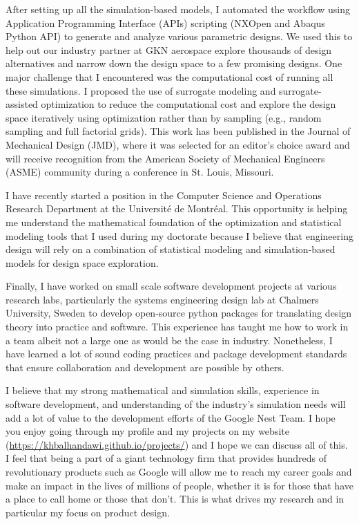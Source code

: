 \documentclass[12pt]{article} %
\begin{document}
\medskip %

After setting up all the simulation-based models, I automated the workflow using Application Programming Interface (APIs) scripting (NXOpen and Abaqus Python API)  to generate and analyze various parametric designs. We used this to help out our industry partner at GKN aerospace explore thousands of design alternatives and narrow down the design space to a few promising designs. One major challenge that I encountered was the computational cost of running all these simulations. I proposed the use of surrogate modeling and surrogate-assisted optimization to reduce the computational cost and explore the design space iteratively using optimization rather than by sampling (e.g., random sampling and full factorial grids). This work has been published in the Journal of Mechanical Design (JMD), where it was selected for an editor's choice award and will receive recognition from the American Society of Mechanical Engineers (ASME) community during a conference in St. Louis, Missouri.

\medskip %

I have recently started a position in the Computer Science and Operations Research Department at the Universit\'{e} de Montr\'{e}al. This opportunity is helping me understand the mathematical foundation of the optimization and statistical modeling tools that I used during my doctorate because I believe that engineering design will rely on a combination of statistical modeling and simulation-based models for design space exploration.

\medskip %

Finally, I have worked on small scale software development projects at various research labs, particularly the systems engineering design lab at Chalmers University, Sweden to develop open-source python packages for translating design theory into practice and software. This experience has taught me how to work in a team albeit not a large one as would be the case in industry. Nonetheless, I have learned a lot of sound coding practices and package development standards that ensure collaboration and development are possible by others.

\medskip %

I believe that my strong mathematical and simulation skills, experience in software development, and understanding of the industry's simulation needs will add a lot of value to the development efforts of the Google Nest Team. I hope you enjoy going through my profile and my projects on my website (\href{https://khbalhandawi.github.io/projects/}{https://khbalhandawi.github.io/projects/}) and I hope we can discuss all of this. I feel that being a part of a giant technology firm that provides hundreds of revolutionary products such as Google will allow me to reach my career goals and make an impact in the lives of millions of people, whether it is for those that have a place to call home or those that don't. This is what drives my research and in particular my focus on product design.
\end{document}
